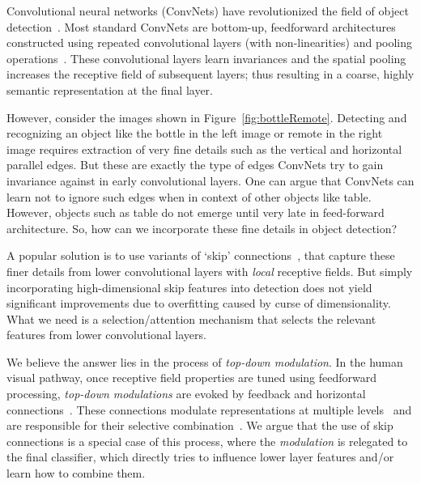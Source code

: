 \documentclass[10pt,twocolumn,letterpaper]{article}
\begin{document}
Convolutional neural networks (ConvNets) have revolutionized the field of object detection~\cite{rcnn,girshick2015fast,ren2015faster,szegedy2013deep,gidaris2015object,shrivastavaOHEM,bell2015inside}. Most standard ConvNets are bottom-up, feedforward architectures constructed using repeated convolutional layers (with non-linearities) and pooling operations~\cite{alexnet,VGG,resnet,googlenet,szegedy2016inception}. These convolutional layers learn invariances and the spatial pooling increases the receptive field of subsequent layers; thus resulting in a coarse, highly semantic representation at the final layer.

However, consider the images shown in Figure~\ref{fig:bottleRemote}. Detecting and recognizing an object like the bottle in the left image or remote in the right image requires extraction of very fine details such as the vertical and horizontal parallel edges. But these are exactly the type of edges ConvNets try to gain invariance against in early convolutional layers. One can argue that ConvNets can learn not to ignore such edges when in context of other objects like table. However, objects such as table do not emerge until very late in feed-forward architecture. So, how can we incorporate these fine details in object detection?

A popular solution is to use variants of `skip' connections~\cite{sermanet2013pedestrian,farabet2013learning,bell2015inside,hariharan2015hypercolumns,long2015fully,xie2015holistically}, that capture these finer details from lower convolutional layers with \emph{local} receptive fields. But simply incorporating high-dimensional skip features into detection does not yield significant improvements due to overfitting caused by curse of dimensionality. What we need is a selection/attention mechanism that selects the relevant features from lower convolutional layers.

We believe the answer lies in the process of \emph{top-down modulation}. In the human visual pathway, once receptive field properties are tuned using feedforward processing, \emph{top-down modulations} are evoked by feedback and horizontal connections~\cite{lamme1998feedforward,kravitz2013ventral}. These connections modulate representations at multiple levels~\cite{zanto2010top,zanto2011causal,gazzaley2012top,piech2013network,gilbert2007brain} and are responsible for their selective combination~\cite{hopfinger2000neural,chun1999top}. We argue that the use of skip connections is a special case of this process, where the \emph{modulation} is relegated to the final classifier, which directly tries to influence lower layer features and/or learn how to combine them.
\end{document}
